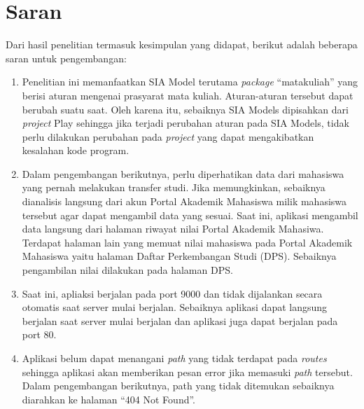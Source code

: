 \section{Saran}
\label{sec:saran}
Dari hasil penelitian termasuk kesimpulan yang didapat, berikut adalah beberapa saran untuk pengembangan:
	\begin{enumerate}
		\item Penelitian ini memanfaatkan SIA Model terutama \textit{package} ``matakuliah'' yang berisi aturan mengenai prasyarat mata kuliah. Aturan-aturan tersebut dapat berubah suatu saat. Oleh karena itu, sebaiknya SIA Models dipisahkan dari \textit{project} Play sehingga jika terjadi perubahan aturan pada SIA Models, tidak perlu dilakukan perubahan pada \textit{project} yang dapat mengakibatkan kesalahan kode program. 
		\item Dalam pengembangan berikutnya, perlu diperhatikan data dari mahasiswa yang pernah melakukan transfer studi. Jika memungkinkan, sebaiknya dianalisis langsung dari akun Portal Akademik Mahasiswa milik mahasiswa tersebut agar dapat mengambil data yang sesuai. Saat ini, aplikasi mengambil data langsung dari halaman riwayat nilai Portal Akademik Mahasiwa. Terdapat halaman lain yang memuat nilai mahasiswa pada Portal Akademik Mahasiswa yaitu halaman Daftar Perkembangan Studi (DPS). Sebaiknya pengambilan nilai dilakukan pada halaman DPS.
		\item Saat ini, apliaksi berjalan pada port 9000 dan tidak dijalankan secara otomatis saat server mulai berjalan. Sebaiknya aplikasi dapat langsung berjalan saat server mulai berjalan dan aplikasi juga dapat berjalan pada port 80.
		\item Aplikasi belum dapat menangani \textit{path} yang tidak terdapat pada \textit{routes} sehingga aplikasi akan memberikan pesan error jika memasuki \textit{path} tersebut. Dalam pengembangan berikutnya, path yang tidak ditemukan sebaiknya diarahkan ke halaman ``404 Not Found''.
	\end{enumerate}